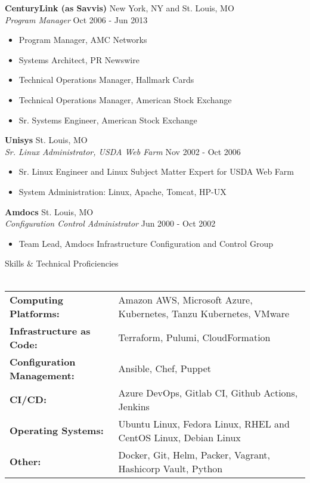 \documentclass[letterpaper]{article}
\newcommand{\lineunder} {
    \vspace*{-8pt} \\
    \hspace*{-18pt} \hrulefill \\
}
\newcommand{\header} [1] {
    {\hspace*{-18pt}\vspace*{6pt} #1}
    \vspace*{-6pt} \lineunder
}
\begin{document}
\textbf{CenturyLink (as Savvis)} \hfill New York, NY and St. Louis, MO\\
\textit{Program Manager} \hfill Oct 2006 - Jun 2013\\
\vspace{-1mm}
\begin{itemize} \itemsep 1pt
	\item Program Manager, AMC Networks
	\item Systems Architect, PR Newswire
	\item Technical Operations Manager, Hallmark Cards
	\item Technical Operations Manager, American Stock Exchange
	\item Sr. Systems Engineer, American Stock Exchange
\end{itemize}
\textbf{Unisys} \hfill St. Louis, MO\\
\textit{Sr. Linux Administrator, USDA Web Farm} \hfill Nov 2002 - Oct 2006\\
\vspace{-1mm}
\begin{itemize} \itemsep 1pt
	\item Sr. Linux Engineer and Linux Subject Matter Expert for USDA Web Farm
	\item System Administration: Linux, Apache, Tomcat, HP-UX
\end{itemize}
\textbf{Amdocs} \hfill St. Louis, MO\\
\textit{Configuration Control Administrator} \hfill Jun 2000 - Oct 2002\\
\vspace{-1mm}
\begin{itemize} \itemsep 1pt
	\item Team Lead, Amdocs Infrastructure Configuration and Control Group
\end{itemize}

\header{Skills \& Technical Proficiencies}
\begin{tabular}{ l l }
  \textbf{Computing Platforms:}      & Amazon AWS, Microsoft Azure, Kubernetes, Tanzu Kubernetes, VMware\\
  \textbf{Infrastructure as Code:}   & Terraform, Pulumi, CloudFormation                                \\
  \textbf{Configuration Management:} & Ansible, Chef, Puppet                                            \\
  \textbf{CI/CD:}                    & Azure DevOps, Gitlab CI, Github Actions, Jenkins                 \\
  \textbf{Operating Systems:}        & Ubuntu Linux, Fedora Linux, RHEL and CentOS Linux, Debian Linux  \\
  \textbf{Other:}                    & Docker, Git, Helm, Packer, Vagrant, Hashicorp Vault, Python      \\
\end{tabular}
\vspace{2mm}
\end{document}
